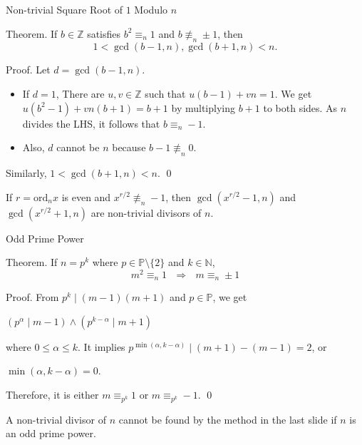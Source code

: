 \documentclass{beamer}
\newcommand{\mbb}[1]{\mathbb{#1}}
\newcommand{\mrm}[1]{\mathrm{#1}}
\renewcommand{\:}{\text{ }}
\newcommand{\ord}[1]{\mrm{ord}_{#1}}
\begin{document}
    \begin{frame}{Non-trivial Square Root of $1$ Modulo $n$}
        \begin{exampleblock}{Theorem.}
            If $b \in \mbb{Z}$ satisfies $b^2 \equiv_n 1$ and $b \not\equiv_n \pm 1$,
            then \[ 1 < \gcd(b - 1, n), \gcd(b+1, n) < n\text{.} \]
        \end{exampleblock}
        \begin{exampleblock}{Proof.}
            \small
            Let $d = \gcd(b-1, n)$.
            \begin{itemize}
                \setlength\itemsep{-0.2em}
                \item If $d = 1$, There are $u, v \in \mbb{Z}$ such that $u(b-1)+vn=1$.
                      We get $u(b^2-1)+vn(b+1)=b+1$ by multiplying $b+1$ to both sides. As $n$ divides the LHS, it follows that $b \equiv_n -1$.
                \item Also, $d$ cannot be $n$ because $b-1 \not\equiv_n 0$.
            \end{itemize}
            Similarly, $1 < \gcd(b+1, n) < n$. \qed
        \end{exampleblock}
        \begin{alertblock}{}
            \small
            If $r = \ord{n}x$ is even and $x^{r/2} \not\equiv_n -1$,
            then $\gcd(x^{r/2}-1,n)$ and $\gcd(x^{r/2}+1,n)$ are non-trivial divisors of $n$.
        \end{alertblock}
    \end{frame}

    \begin{frame}{Odd Prime Power}
        \begin{exampleblock}{Theorem.}
            If $n = p^k$ where $p \in \mbb{P} \setminus \{2\}$ and $k \in \mbb{N}$,
            \[ m^2 \equiv_n 1 \:\Longrightarrow\: m \equiv_n \pm 1 \]
        \end{exampleblock}
        \begin{exampleblock}{Proof.}
            \small
            From $p^k \mid (m-1)(m+1)$ and $p \in \mbb{P}$, we get \\[.5em]
            \centerline{$(p^\alpha \mid m-1) \land (p^{k-\alpha} \mid m+1)$} \vspace*{.5em}
            where $0 \leq \alpha \leq k$. It implies $p^{\min(\alpha, k-\alpha)} \mid (m+1)-(m-1) = 2$, or \\[.5em]
            \centerline{$\min(\alpha, k-\alpha) = 0\text{.}$} \vspace*{.5em}
            Therefore, it is either $m \equiv_{p^k} 1$ or $m \equiv_{p^k} -1$. \qed
        \end{exampleblock}
        \begin{alertblock}{}
            A non-trivial divisor of $n$ cannot be found by the method in the last slide if $n$ is an odd prime power.
        \end{alertblock}
    \end{frame}
\end{document}
